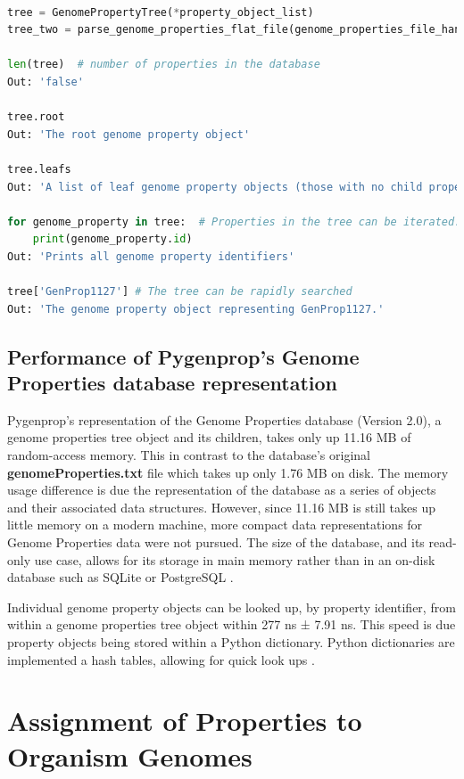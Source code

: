 \begin{lstlisting}[language=Python]

tree = GenomePropertyTree(*property_object_list)
tree_two = parse_genome_properties_flat_file(genome_properties_file_handle)
	
len(tree)  # number of properties in the database
Out: 'false'

tree.root
Out: 'The root genome property object'

tree.leafs
Out: 'A list of leaf genome property objects (those with no child properties)'

for genome_property in tree:  # Properties in the tree can be iterated.
	print(genome_property.id)
Out: 'Prints all genome property identifiers'

tree['GenProp1127'] # The tree can be rapidly searched
Out: 'The genome property object representing GenProp1127.'

\end{lstlisting}

\subsection{Performance of Pygenprop's Genome Properties database representation}

Pygenprop's representation of the Genome Properties database (Version 2.0), a genome properties tree object and its children, takes only up 11.16 MB of random-access memory. This in contrast to the database's original \textbf{genomeProperties.txt} file which takes up only 1.76 MB on disk. The memory usage difference is due the representation of the database as a series of objects and their associated data structures. However, since 11.16 MB is still takes up little memory on a modern machine, more compact data representations for Genome Properties data were not pursued. The size of the database, and its read-only use case, allows for its storage in main memory rather than in an on-disk database such as SQLite \cite{owens2006definitive} or PostgreSQL \cite{momjian2001postgresql}.

Individual genome property objects can be looked up, by property identifier, from within a genome properties tree object within 277 ns ± 7.91 ns. This speed is due property objects being stored within a Python dictionary. Python dictionaries are implemented a hash tables, allowing for quick look ups \cite{van1995python}.

\section{Assignment of Properties to Organism Genomes}

